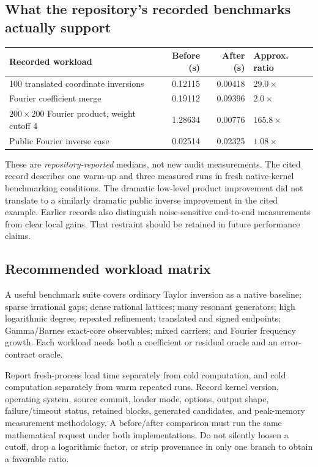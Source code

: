 \documentclass[11pt,letterpaper]{article}
\begin{document}
\subsection{What the repository's recorded benchmarks actually support}
\begin{longtable}{@{}p{}r r p{}@{}}
\toprule
Recorded workload & Before (s) & After (s) & Approx. ratio\\
\midrule\endhead
100 translated coordinate inversions & 0.12115 & 0.00418 & $29.0\times$\\
Fourier coefficient merge & 0.19112 & 0.09396 & $2.0\times$\\
$200\times200$ Fourier product, weight cutoff 4 & 1.28634 & 0.00776 & $165.8\times$\\
Public Fourier inverse case & 0.02514 & 0.02325 & $1.08\times$\\
\bottomrule
\end{longtable}
These are \emph{repository-reported} medians, not new audit measurements. The cited record describes one warm-up and three measured runs in fresh native-kernel benchmarking conditions. The dramatic low-level product improvement did not translate to a similarly dramatic public inverse improvement in the cited example. Earlier records also distinguish noise-sensitive end-to-end measurements from clear local gains. That restraint should be retained in future performance claims.\cite{validation}

\subsection{Recommended workload matrix}
A useful benchmark suite covers ordinary Taylor inversion as a native baseline; sparse irrational gaps; dense rational lattices; many resonant generators; high logarithmic degree; repeated refinement; translated and signed endpoints; Gamma/Barnes exact-core observables; mixed carriers; and Fourier frequency growth. Each workload needs both a coefficient or residual oracle and an error-contract oracle.

Report fresh-process load time separately from cold computation, and cold computation separately from warm repeated runs. Record kernel version, operating system, source commit, loader mode, options, output shape, failure/timeout status, retained blocks, generated candidates, and peak-memory measurement methodology. A before/after comparison must run the same mathematical request under both implementations. Do not silently loosen a cutoff, drop a logarithmic factor, or strip provenance in only one branch to obtain a favorable ratio.
\end{document}
